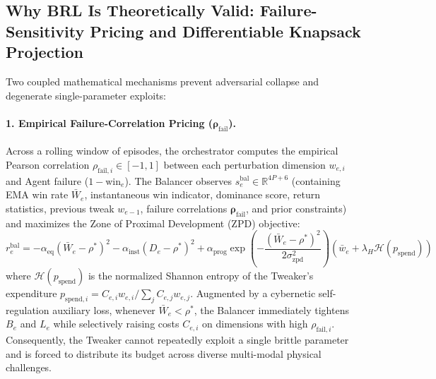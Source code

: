 \documentclass[11pt,a4paper]{article}
\begin{document}
\subsection{Why BRL Is Theoretically Valid: Failure-Sensitivity Pricing and Differentiable Knapsack Projection}
Two coupled mathematical mechanisms prevent adversarial collapse and degenerate single-parameter exploits:

\paragraph{1. Empirical Failure-Correlation Pricing ($\boldsymbol{\rho}_{\text{fail}}$).}
Across a rolling window of episodes, the orchestrator computes the empirical Pearson correlation $\rho_{\text{fail},i} \in [-1, 1]$ between each perturbation dimension $w_{e,i}$ and Agent failure ($1 - \text{win}_e$). The Balancer observes $s_e^{\text{bal}} \in \mathbb{R}^{4P+6}$ (containing EMA win rate $\bar{W}_e$, instantaneous win indicator, dominance score, return statistics, previous tweak $w_{e-1}$, failure correlations $\boldsymbol{\rho}_{\text{fail}}$, and prior constraints) and maximizes the Zone of Proximal Development (ZPD) objective:
\begin{equation}
    r_e^{\text{bal}} = -\alpha_{\text{eq}}(\bar{W}_e - \rho^*)^2 - \alpha_{\text{inst}}(D_e - \rho^*)^2 + \alpha_{\text{prog}} \exp\!\left(-\frac{(\bar{W}_e - \rho^*)^2}{2\sigma_{\text{zpd}}^2}\right)\!\left(\bar{w}_e + \lambda_H \mathcal{H}(p_{\text{spend}})\right)
\end{equation}
where $\mathcal{H}(p_{\text{spend}})$ is the normalized Shannon entropy of the Tweaker's expenditure $p_{\text{spend},i} = C_{e,i} w_{e,i} / \sum_j C_{e,j} w_{e,j}$. Augmented by a cybernetic self-regulation auxiliary loss, whenever $\bar{W}_e < \rho^*$, the Balancer immediately tightens $B_e$ and $L_e$ while selectively raising costs $C_{e,i}$ on dimensions with high $\rho_{\text{fail},i}$. Consequently, the Tweaker cannot repeatedly exploit a single brittle parameter and is forced to distribute its budget across diverse multi-modal physical challenges.
\end{document}
